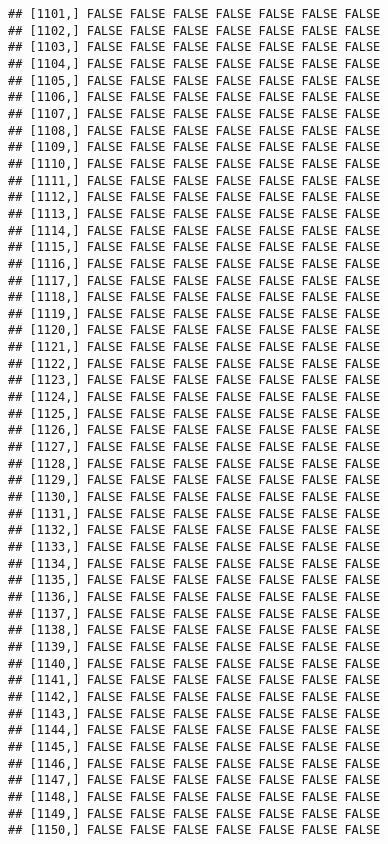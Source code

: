 \documentclass[
]{article}
\begin{document}
\begin{verbatim}
## [1101,] FALSE FALSE FALSE FALSE FALSE FALSE FALSE
## [1102,] FALSE FALSE FALSE FALSE FALSE FALSE FALSE
## [1103,] FALSE FALSE FALSE FALSE FALSE FALSE FALSE
## [1104,] FALSE FALSE FALSE FALSE FALSE FALSE FALSE
## [1105,] FALSE FALSE FALSE FALSE FALSE FALSE FALSE
## [1106,] FALSE FALSE FALSE FALSE FALSE FALSE FALSE
## [1107,] FALSE FALSE FALSE FALSE FALSE FALSE FALSE
## [1108,] FALSE FALSE FALSE FALSE FALSE FALSE FALSE
## [1109,] FALSE FALSE FALSE FALSE FALSE FALSE FALSE
## [1110,] FALSE FALSE FALSE FALSE FALSE FALSE FALSE
## [1111,] FALSE FALSE FALSE FALSE FALSE FALSE FALSE
## [1112,] FALSE FALSE FALSE FALSE FALSE FALSE FALSE
## [1113,] FALSE FALSE FALSE FALSE FALSE FALSE FALSE
## [1114,] FALSE FALSE FALSE FALSE FALSE FALSE FALSE
## [1115,] FALSE FALSE FALSE FALSE FALSE FALSE FALSE
## [1116,] FALSE FALSE FALSE FALSE FALSE FALSE FALSE
## [1117,] FALSE FALSE FALSE FALSE FALSE FALSE FALSE
## [1118,] FALSE FALSE FALSE FALSE FALSE FALSE FALSE
## [1119,] FALSE FALSE FALSE FALSE FALSE FALSE FALSE
## [1120,] FALSE FALSE FALSE FALSE FALSE FALSE FALSE
## [1121,] FALSE FALSE FALSE FALSE FALSE FALSE FALSE
## [1122,] FALSE FALSE FALSE FALSE FALSE FALSE FALSE
## [1123,] FALSE FALSE FALSE FALSE FALSE FALSE FALSE
## [1124,] FALSE FALSE FALSE FALSE FALSE FALSE FALSE
## [1125,] FALSE FALSE FALSE FALSE FALSE FALSE FALSE
## [1126,] FALSE FALSE FALSE FALSE FALSE FALSE FALSE
## [1127,] FALSE FALSE FALSE FALSE FALSE FALSE FALSE
## [1128,] FALSE FALSE FALSE FALSE FALSE FALSE FALSE
## [1129,] FALSE FALSE FALSE FALSE FALSE FALSE FALSE
## [1130,] FALSE FALSE FALSE FALSE FALSE FALSE FALSE
## [1131,] FALSE FALSE FALSE FALSE FALSE FALSE FALSE
## [1132,] FALSE FALSE FALSE FALSE FALSE FALSE FALSE
## [1133,] FALSE FALSE FALSE FALSE FALSE FALSE FALSE
## [1134,] FALSE FALSE FALSE FALSE FALSE FALSE FALSE
## [1135,] FALSE FALSE FALSE FALSE FALSE FALSE FALSE
## [1136,] FALSE FALSE FALSE FALSE FALSE FALSE FALSE
## [1137,] FALSE FALSE FALSE FALSE FALSE FALSE FALSE
## [1138,] FALSE FALSE FALSE FALSE FALSE FALSE FALSE
## [1139,] FALSE FALSE FALSE FALSE FALSE FALSE FALSE
## [1140,] FALSE FALSE FALSE FALSE FALSE FALSE FALSE
## [1141,] FALSE FALSE FALSE FALSE FALSE FALSE FALSE
## [1142,] FALSE FALSE FALSE FALSE FALSE FALSE FALSE
## [1143,] FALSE FALSE FALSE FALSE FALSE FALSE FALSE
## [1144,] FALSE FALSE FALSE FALSE FALSE FALSE FALSE
## [1145,] FALSE FALSE FALSE FALSE FALSE FALSE FALSE
## [1146,] FALSE FALSE FALSE FALSE FALSE FALSE FALSE
## [1147,] FALSE FALSE FALSE FALSE FALSE FALSE FALSE
## [1148,] FALSE FALSE FALSE FALSE FALSE FALSE FALSE
## [1149,] FALSE FALSE FALSE FALSE FALSE FALSE FALSE
## [1150,] FALSE FALSE FALSE FALSE FALSE FALSE FALSE

\end{verbatim}
\end{document}
